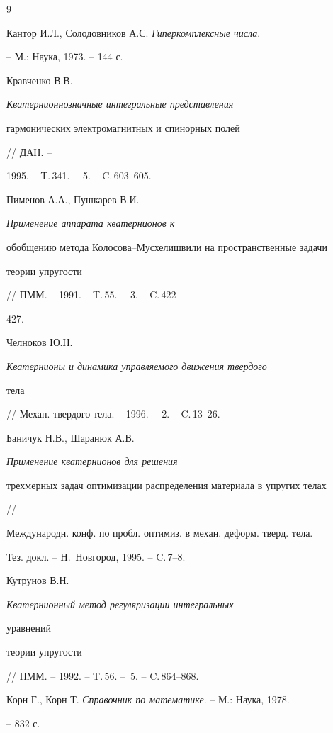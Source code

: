 \begin{thebibliography}{9} 


 




Кантор И.Л., Солодовников А.С. {\em Гиперкомплексные числа}. 


-- М.: Наука, 1973. -- 144 с. 




Кравченко В.В. {\em Кватернионнозначные интегральные представления  


гармонических электромагнитных и спинорных полей} // ДАН. -- 


1995. -- T.\,341. -- \No\,5. -- C.\,603--605. 




Пименов А.А., Пушкарев В.И. {\em Применение аппарата кватернионов к 


обобщению метода Колосова--Мусхелишвили на пространственные задачи 


теории упругости} // ПММ. -- 1991. -- T.\,55. -- \No\,3. -- C.\,422--


427. 




Челноков Ю.Н. {\em Кватернионы и динамика управляемого движения твердого  


тела}// Механ. твердого тела. -- 1996. -- \No\,2. -- C.\,13--26. 




Баничук Н.В., Шаранюк А.В. {\em Применение кватернионов для решения 


трехмерных задач оптимизации распределения материала в упругих телах} 


// 


Международн. конф. по пробл. оптимиз. в механ. деформ. тверд. тела. 


Тез. докл. -- Н.~Новгород, 1995. -- C.\,7--8. 




Кутрунов В.Н. {\em Кватернионный метод регуляризации интегральных 


уравнений 


теории упругости} // ПММ. -- 1992. -- T.\,56. -- \No\,5. -- C.\,864--868. 




Корн Г., Корн Т. {\em Справочник по математике}. -- М.: Наука, 1978. 


-- 832 с. 


\end{thebibliography} 


 


\vskip 2cm 


 








 


\label{end} 


 


